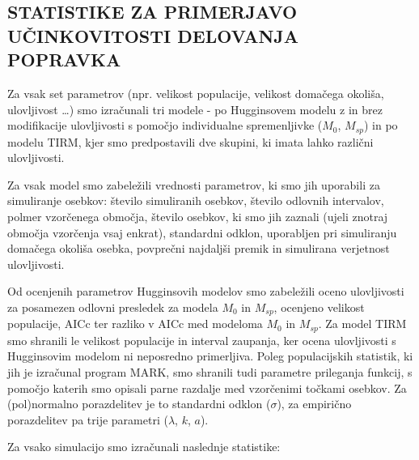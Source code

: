 \subsection{STATISTIKE ZA PRIMERJAVO UČINKOVITOSTI DELOVANJA POPRAVKA}
Za vsak set parametrov (npr. velikost populacije, velikost domačega okoliša, ulovljivost …) smo izračunali tri modele - po Hugginsovem modelu z in brez modifikacije ulovljivosti s pomočjo individualne spremenljivke ($M_0$, $M_{sp}$) in po modelu TIRM, kjer smo predpostavili dve skupini, ki imata lahko različni ulovljivosti.

Za vsak model smo zabeležili vrednosti parametrov, ki smo jih uporabili za simuliranje osebkov: število simuliranih osebkov, število odlovnih intervalov, polmer vzorčenega območja, število osebkov, ki smo jih zaznali (ujeli znotraj območja vzorčenja vsaj enkrat), standardni odklon, uporabljen pri simuliranju domačega okoliša osebka, povprečni najdaljši premik in simulirana verjetnost ulovljivosti.

Od ocenjenih parametrov Hugginsovih modelov smo zabeležili oceno ulovljivosti za posamezen odlovni presledek za modela $M_0$ in $M_{sp}$, ocenjeno velikost populacije, AICc ter razliko v AICc med modeloma $M_0$ in $M_{sp}$. Za model TIRM smo shranili le velikost populacije in interval zaupanja, ker ocena ulovljivosti s Hugginsovim modelom ni neposredno primerljiva.
Poleg populacijskih statistik, ki jih je izračunal program MARK, smo shranili tudi parametre prileganja funkcij, s pomočjo katerih smo opisali parne razdalje med vzorčenimi točkami osebkov. Za (pol)normalno porazdelitev je to standardni odklon ($\sigma$), za empirično porazdelitev pa trije parametri ($\lambda$, $k$, $a$).


Za vsako simulacijo smo izračunali naslednje statistike:

